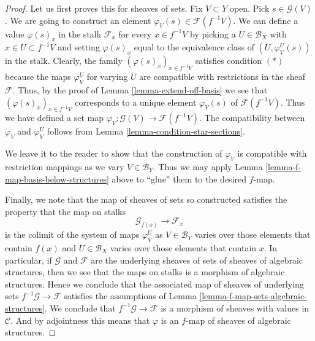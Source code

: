 \begin{proof}
Let us first proves this for sheaves of sets.
Fix $V \subset Y$ open. Pick $s \in \mathcal{G}(V)$.
We are going to construct an element
$\varphi_V(s) \in \mathcal{F}(f^{-1}V)$.
We can define a value $\varphi(s)_x$ in the stalk $\mathcal{F}_x$
for every $x \in f^{-1}V$ by picking a $U \in \mathcal{B}_X$
with $x \in U \subset f^{-1}V$ and setting $\varphi(s)_x$
equal to the equivalence class of $(U, \varphi_V^U(s))$
in the stalk. Clearly, the family $(\varphi(s)_x)_{x \in f^{-1}V}$
satisfies condition $(*)$ because the maps $\varphi_V^U$
for varying $U$
are compatible with restrictions in the sheaf $\mathcal{F}$.
Thus, by the proof of Lemma \ref{lemma-extend-off-basis}
we see that $(\varphi(s)_x)_{x \in f^{-1}V}$ corresponds
to a unique element $\varphi_V(s)$ of $\mathcal{F}(f^{-1}V)$.
Thus we have defined a set map
$\varphi_V : \mathcal{G}(V) \to \mathcal{F}(f^{-1}V)$.
The compatibility between $\varphi_V$ and $\varphi_V^U$
follows from Lemma \ref{lemma-condition-star-sections}.

\medskip\noindent
We leave it to the reader to show that the construction
of $\varphi_V$ is compatible with restriction mappings as we vary
$V \in \mathcal{B}_Y$. Thus we may apply Lemma
\ref{lemma-f-map-basis-below-structures} above to
``glue'' them to the desired $f$-map.

\medskip\noindent
Finally, we note that the map of sheaves of sets so constructed
satisfies the property that the map on stalks
$$
\mathcal{G}_{f(x)} \longrightarrow \mathcal{F}_x
$$
is the colimit of the system of maps $\varphi_V^U$ as
$V \in \mathcal{B}_Y$ varies over those elements that
contain $f(x)$ and $U \in \mathcal{B}_X$ varies over those elements that
contain $x$. In particular, if $\mathcal{G}$ and $\mathcal{F}$
are the underlying sheaves of sets of sheaves of algebraic structures,
then we see that the maps on stalks is a morphism of algebraic
structures. Hence we conclude that the associated map of
sheaves of underlying sets $f^{-1}\mathcal{G} \to \mathcal{F}$
satisfies the assumptions of
Lemma \ref{lemma-f-map-sets-algebraic-structures}.
We conclude that $f^{-1}\mathcal{G} \to \mathcal{F}$
is a morphism of sheaves with values in $\mathcal{C}$.
And by adjointness this means that $\varphi$ is
an $f$-map of sheaves of algebraic structures.
\end{proof}

